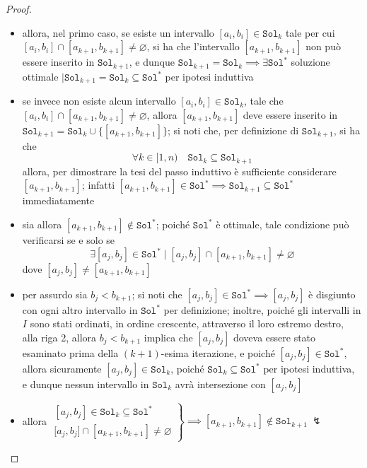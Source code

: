 \documentclass[a4paper, 12pt]{report}
\begin{document}
\begin{proof}
\begin{itemize}
\begin{itemize}
                    \item allora, nel primo caso, se esiste un intervallo $[a_i, b_i] \in \texttt{Sol}_k$ tale per cui $[a_i, b_i] \cap [a_{k + 1}, b_{k + 1}] \neq \varnothing$, si ha che l'intervallo $[a_{k + 1}, b_{k + 1}]$ non può essere inserito in $\texttt{Sol}_{k + 1}$, e dunque $\texttt{Sol}_{k + 1} = \texttt{Sol}_k \implies \exists \texttt{Sol}^*$ soluzione ottimale $\mid \texttt{Sol}_{k + 1} = \texttt{Sol}_k \subseteq \texttt{Sol}^*$ per ipotesi induttiva
                    \item se invece non esiste alcun intervallo $[a_i, b_i] \in \texttt{Sol}_k$, tale che $[a_i, b_i] \cap [a_{k + 1}, b_{k + 1}] \neq \varnothing$, allora $[a_{k + 1}, b_{k + 1}]$ deve essere inserito in $\texttt{Sol}_{k + 1} = \texttt{Sol}_k \cup \{[a_{k + 1}, b_{k + 1}]\}$; si noti che, per definizione di $\texttt{Sol}_{k + 1}$, si ha che $$\forall k \in [1, n) \quad \texttt{Sol}_k \subseteq \texttt{Sol}_{k + 1}$$ allora, per dimostrare la tesi del passo induttivo è sufficiente considerare $[a_{k + 1}, b_{k + 1}]$; infatti $[a_{k + 1}, b_{k + 1}] \in \texttt{Sol}^* \implies \texttt{Sol}_{k +1} \subseteq \texttt{Sol}^*$ immediatamente
                    \item sia allora $[a_{k +1}, b_{k +1}] \notin \texttt{Sol}^*$; poiché $\texttt{Sol}^*$ è ottimale, tale condizione può verificarsi se e solo se $$\exists [a_j, b_j] \in \texttt{Sol}^* \mid [a_j, b_j] \cap [a_{k +1}, b_{k +1}] \neq \varnothing$$
                    dove $[a_j, b_j] \neq [a_{k +1},b_{k +1}]$
                    \item per assurdo sia $b_j < b_{k + 1}$; si noti che $[a_j, b_j] \in \texttt{Sol}^* \implies [a_j, b_j]$ è disgiunto con ogni altro intervallo in $\texttt{Sol}^*$ per definizione; inoltre, poiché gli intervalli in $I$ sono stati ordinati, in ordine crescente, attraverso il loro estremo destro, alla riga 2, allora $b_j < b_{k + 1}$ implica che $[a_j, b_j]$ doveva essere stato esaminato prima della $(k + 1)$-esima iterazione, e poiché $[a_j, b_j] \in \texttt{Sol}^*$, allora sicuramente $[a_j, b_j] \in \texttt{Sol}_k$, poiché $\texttt{Sol}_k \subseteq \texttt{Sol}^*$ per ipotesi induttiva, e dunque nessun intervallo in $\texttt{Sol}_k$ avrà intersezione con $[a_j, b_j]$
                    \item allora $\left. \begin{array}{l} [a_j, b_j] \in \texttt{Sol}_k \subseteq \texttt{Sol}^* \\ {[}a_j, b_j] \cap [a_{k +1}, b_{k + 1}] \neq \varnothing \end{array}\right \} \implies [a_{k +1}, b_{k +1}] \notin \texttt{Sol}_{k +1} \ \lightning$ 

\end{itemize}
\end{itemize}
\end{proof}
\end{document}
